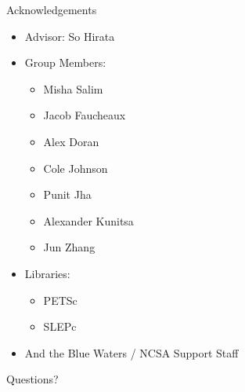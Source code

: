 \documentclass[10pt]{beamer}
\begin{document}
{{{{{{{{{{{{{
\begin{frame}{Acknowledgements}
  \begin{itemize}
    \item{ Advisor: So Hirata }
    \item{ Group Members: 
      \begin{itemize}
        \item{ Misha Salim }
        \item{ Jacob Faucheaux }
        \item{ Alex Doran }
        \item{ Cole Johnson }
        \item{ Punit Jha }
        \item{ Alexander Kunitsa } 
        \item{ Jun Zhang } 
      \end{itemize}
    }
    \item{ Libraries: 
      \begin{itemize}
        \item{ PETSc }
        \item{ SLEPc }
      \end{itemize}
    }
    \item{ And the Blue Waters / NCSA Support Staff }
  \end{itemize}
\end{frame}


{%
\begin{frame}[standout]
  Questions?
\end{frame}


\appendix



}}}}}}}}}}}}}}
\end{document}
